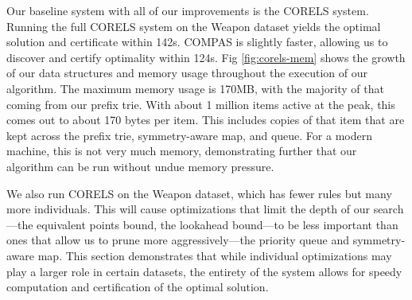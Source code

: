Our baseline system with all of our improvements is the CORELS system.
Running the full CORELS system on the Weapon dataset yields the optimal solution and certificate within 142s.
COMPAS is slightly faster, allowing us to discover and certify optimality within 124s.
Fig \ref{fig:corels-mem} shows the growth of our data structures and memory usage throughout the execution of our algorithm.
The maximum memory usage is 170MB, with the majority of that coming from our prefix trie.
With about 1 million items active at the peak, this comes out to about 170 bytes per item.
This includes copies of that item that are kept across the prefix trie, symmetry-aware map, and queue.
For a modern machine, this is not very much memory, demonstrating further that our algorithm can be run without undue memory pressure.

We also run CORELS on the Weapon dataset, which has fewer rules but many more individuals.
This will cause optimizations that limit the depth of our search---the equivalent points bound, the lookahead bound---to be less important than ones that allow us to prune more aggressively---the priority queue and symmetry-aware map.
This section demonstrates that while individual optimizations may play a larger role in certain datasets, the entirety of the system allows for speedy computation and certification of the optimal solution.

